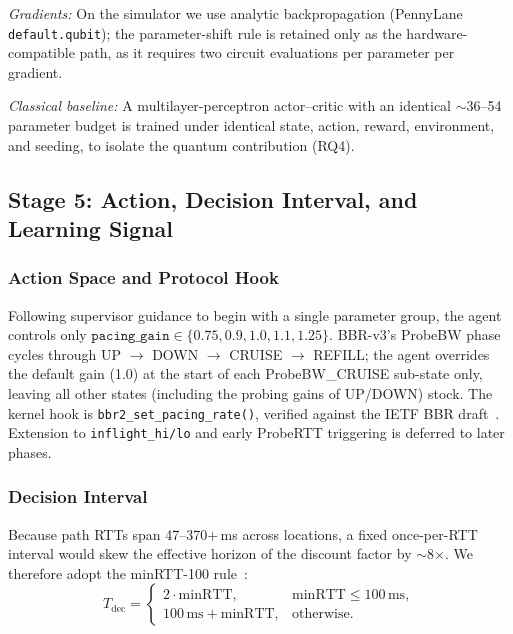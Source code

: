 \documentclass[journal]{IEEEtran}
\begin{document}
\emph{Gradients:} On the simulator we use analytic backpropagation
(PennyLane \texttt{default.qubit}); the parameter-shift rule is retained
only as the hardware-compatible path, as it requires two circuit
evaluations per parameter per gradient.

\emph{Classical baseline:} A multilayer-perceptron actor--critic with an
identical $\sim$36--54 parameter budget is trained under identical state,
action, reward, environment, and seeding, to isolate the quantum
contribution (RQ4).

\subsection{Stage 5: Action, Decision Interval, and Learning
Signal}
\label{sec:reward}

\subsubsection{Action Space and Protocol Hook}
Following supervisor guidance to begin with a single parameter group, the
agent controls only
$\texttt{pacing\_gain}\in\{0.75, 0.9, 1.0, 1.1, 1.25\}$. BBR-v3's ProbeBW
phase cycles through UP $\to$ DOWN $\to$ CRUISE $\to$ REFILL; the agent
overrides the default gain (1.0) at the start of each ProbeBW\_CRUISE
sub-state only, leaving all other states (including the probing gains of
UP/DOWN) stock. The kernel hook is \texttt{bbr2\_set\_pacing\_rate()},
verified against the IETF BBR draft~\cite{ietfbbr}. Extension to
\texttt{inflight\_hi/lo} and early ProbeRTT triggering is deferred to later
phases.

\subsubsection{Decision Interval}
Because path RTTs span 47--370+\,ms across locations, a fixed once-per-RTT
interval would skew the effective horizon of the discount factor by
$\sim$8$\times$. We therefore adopt the minRTT-100 rule~\cite{yu2026dnccq}:
\begin{equation}
T_{\mathrm{dec}} =
\begin{cases}
2\cdot \mathrm{minRTT}, & \mathrm{minRTT}\le 100\,\mathrm{ms},\\
100\,\mathrm{ms} + \mathrm{minRTT}, & \text{otherwise}.
\end{cases}
\end{equation}
\end{document}

